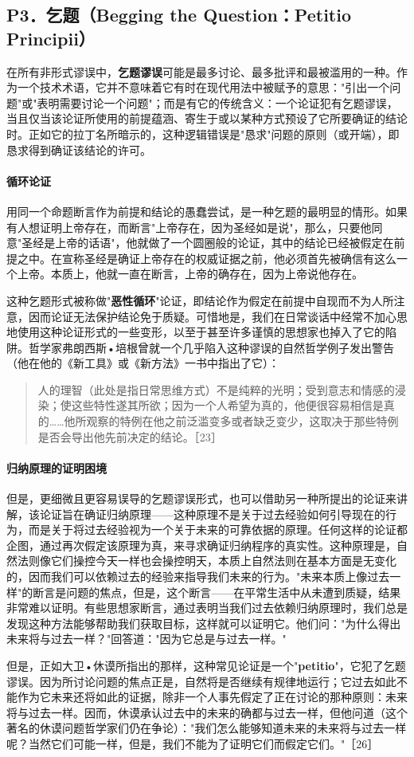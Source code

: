 \subsection{P3．乞题（Begging the Question：Petitio Principii）}

在所有非形式谬误中，\textbf{乞题谬误}可能是最多讨论、最多批评和最被滥用的一种。作为一个技术术语，它并不意味着它有时在现代用法中被赋予的意思："引出一个问题"或"表明需要讨论一个问题"；而是有它的传统含义：一个论证犯有乞题谬误，当且仅当该论证所使用的前提蕴涵、寄生于或以某种方式预设了它所要确证的结论时。正如它的拉丁名所暗示的，这种逻辑错误是"恳求"问题的原则（或开端），即恳求得到确证该结论的许可。

\paragraph{循环论证}
用同一个命题断言作为前提和结论的愚蠢尝试，是一种乞题的最明显的情形。如果有人想证明上帝存在，而断言"上帝存在，因为圣经如是说"，那么，只要他同意"圣经是上帝的话语"，他就做了一个圆圈般的论证，其中的结论已经被假定在前提之中。在宣称圣经是确证上帝存在的权威证据之前，他必须首先被确信有这么一个上帝。本质上，他就一直在断言，上帝的确存在，因为上帝说他存在。

这种乞题形式被称做"\textbf{恶性循环}"论证，即结论作为假定在前提中自现而不为人所注意，因而论证无法保护结论免于质疑。可惜地是，我们在日常谈话中经常不加心思地使用这种论证形式的一些变形，以至于甚至许多谨慎的思想家也掉入了它的陷阱。哲学家弗朗西斯•培根曾就一个几乎陷入这种谬误的自然哲学例子发出警告（他在他的《新工具》或《新方法》一书中指出了它）：

\begin{quote}
人的理智（此处是指日常思维方式）不是纯粹的光明；受到意志和情感的浸染；使这些特性遂其所欲；因为一个人希望为真的，他便很容易相信是真的……他所观察的特例在他之前泛滥变多或者缺乏变少，这取决于那些特例是否会导出他先前决定的结论。［23］
\end{quote}

\paragraph{归纳原理的证明困境}
但是，更细微且更容易误导的乞题谬误形式，也可以借助另一种所提出的论证来讲解，该论证旨在确证归纳原理——这种原理不是关于过去经验如何引导现在的行为，而是关于将过去经验视为一个关于未来的可靠依据的原理。任何这样的论证都企图，通过再次假定该原理为真，来寻求确证归纳程序的真实性。这种原理是，自然法则像它们操控今天一样也会操控明天，本质上自然法则在基本方面是无变化的，因而我们可以依赖过去的经验来指导我们未来的行为。"未来本质上像过去一样"的断言是问题的焦点，但是，这个断言——在平常生活中从未遭到质疑，结果非常难以证明。有些思想家断言，通过表明当我们过去依赖归纳原理时，我们总是发现这种方法能够帮助我们获取目标，这样就可以证明它。他们问："为什么得出未来将与过去一样？"回答道："因为它总是与过去一样。"

但是，正如大卫•休谟所指出的那样，这种常见论证是一个"\textbf{petitio}"，它犯了乞题谬误。因为所讨论问题的焦点正是，自然将是否继续有规律地运行；它过去如此不能作为它未来还将如此的证据，除非一个人事先假定了正在讨论的那种原则：未来将与过去一样。因而，休谟承认过去中的未来的确都与过去一样，但他问道（这个著名的休谟问题哲学家们仍在争论）："我们怎么能够知道未来的未来将与过去一样呢？当然它们可能一样，但是，我们不能为了证明它们而假定它们。"［26］ 